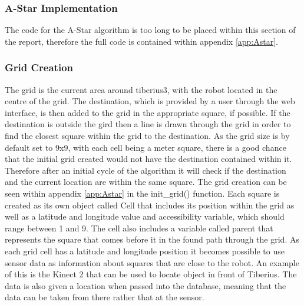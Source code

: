 \subsubsection{A-Star Implementation}
The code for the A-Star algorithm is too long to be placed within this section of the report, therefore the full code is contained within appendix \ref{app:Astar}. 
\subsubsection{Grid Creation}
The grid is the current area around \gls{tiberius3}, with the robot located in the centre of the grid. The destination, which is provided by a user through the web interface, is then added to the grid in the appropriate square, if possible. If the destination is outside the gird then a line is drawn through the grid in order to find the closest square within the grid to the destination. As the grid size is by default set to 9x9, with each cell being a meter square, there is a good chance that the initial grid created would not have the destination contained within it. Therefore after an initial cycle of the algorithm it will check if the destination and the current location are within the same square. The grid creation can be seen within appendix \ref{app:Astar} in the init\_grid() function.
\newline
Each square is created as its own object called Cell that includes its position within the grid as well as a latitude and longitude value and accessibility variable, which should range between 1 and 9. The cell also includes a variable called parent that represents the square that comes before it in the found path through the grid. As each grid cell has a latitude and longitude position it becomes possible to use sensor data as information about squares that are close to the robot. An example of this is the Kinect 2 that can be used to locate object in front of Tiberius. The data is also given a location when passed into the database, meaning that the data can be taken from there rather that at the sensor.

